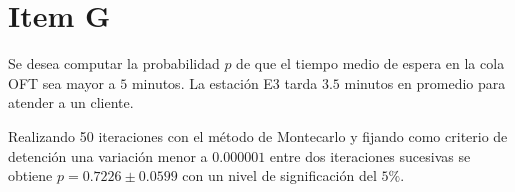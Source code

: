 \documentclass[a4paper,10pt]{article}
\begin{document}
\section*{Item G}

Se desea computar la probabilidad $p$ de que el tiempo medio de espera en la cola
OFT sea mayor a $5$ minutos. La estaci\'on E3 tarda $3.5$ minutos en promedio
para atender a un cliente.

Realizando 50 iteraciones con el m\'etodo de Montecarlo y fijando
como criterio de detenci\'on una variaci\'on menor a $0.000001$ entre dos iteraciones
sucesivas se obtiene $p = 0.7226 \pm 0.0599$ con un nivel de significaci\'on
del $5\%$. 
\end{document}
